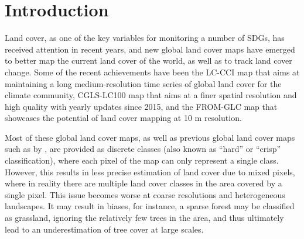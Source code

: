 \documentclass[a4paper,10pt]{article}
\begin{document}
\pagebreak
\tableofcontents
\pagebreak

\section{Introduction}


Land cover, as one of the key variables for monitoring a number of \glspl{SDG}, has received attention in recent years, and new global land cover maps have emerged to better map the current land cover of the world, as well as to track land cover change.
Some of the recent achievements have been the \ac{LC-CCI} map \citep{defourny2012cci} that aims at maintaining a long medium-resolution time series of global land cover for the climate community, \ac{CGLS-LC100} map that aims at a finer spatial resolution and high quality with yearly updates since 2015, and the \ac{FROM-GLC} map \citep{fromglc2019} that showcases the potential of land cover mapping at 10 m resolution.

Most of these global land cover maps, as well as previous global land cover maps such as by \citet{bartholome2005glc2000, friedl2010modis, arino2007globcover, see2015hybrid, chen2015globeland30}, are provided as discrete classes (also known as ``hard'' or ``crisp'' classification), where each pixel of the map can only represent a single class.
However, this results in less precise estimation of land cover due to mixed pixels, where in reality there are multiple land cover classes in the area covered by a single pixel.
This issue becomes worse at coarse resolutions and heterogeneous landscapes.
It may result in biases, for instance, a sparse forest may be classified as grassland, ignoring the relatively few trees in the area, and thus ultimately lead to an underestimation of tree cover at large scales.
\end{document}
